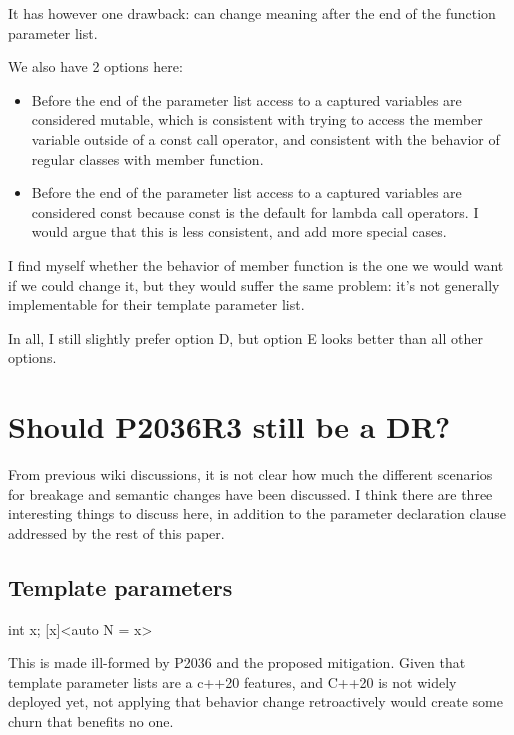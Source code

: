 \documentclass{wg21}
\begin{document}
It has however one drawback:  can change meaning after the end of the function parameter list.

We also have 2 options here:

\begin{itemize}
\item Before the end of the parameter list access to a captured variables are considered mutable, which is consistent with trying to
access the member variable outside of a const call operator, and consistent with the behavior of regular classes with member function.

\item Before the end of the parameter list access to a captured variables are considered const because const is the default for lambda call operators. I would argue that this is less consistent, and add more special cases.
\end{itemize}

I find myself whether the behavior of member function is the one we would want if we could change it,
but they would suffer the same problem: it's not generally implementable for their template parameter list.

In all, I still slightly prefer option D, but option E looks better than all other options.

\section{Should P2036R3 still be a DR?}

From previous wiki discussions, it is not clear how much the different scenarios for breakage and semantic changes have been discussed.
I think there are three interesting things to discuss here, in addition to the parameter declaration clause addressed by the rest of this paper.

\subsection{Template parameters}
\begin{colorblock}
int x;
[x]<auto N = x> {}
\end{colorblock}

This is made ill-formed by P2036 and the proposed mitigation. Given that template parameter lists are a c++20 features, and C++20 is not widely deployed yet, not applying that behavior
change retroactively would create some churn that benefits no one.
\end{document}
